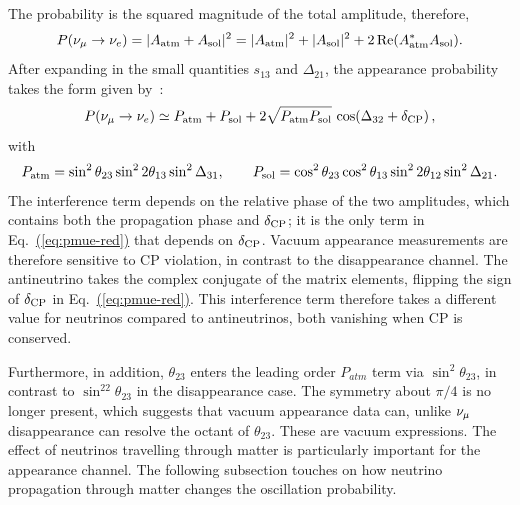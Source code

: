 The probability is the squared magnitude of the total amplitude, therefore,
\begin{equation}
    P(\nu_\mu\to\nu_e) = |A_{\rm atm} + A_{\rm sol}|^{2}
    = |A_{\rm atm}|^{2} + |A_{\rm sol}|^{2} + 2\,\mathrm{Re}(A_{\rm atm}^{*}A_{\rm sol}).
    \label{eq:pmue-amplitude}
\end{equation}
After expanding in the small quantities $s_{13}$ and $\Delta_{21}$, the appearance probability takes the form given by~\cite{NunokawaParkeValle2008,Cervera2000}:
\begin{equation}
    P(\nu_\mu \to \nu_e) \simeq P_{\rm atm} + P_{\rm sol}
    + 2\sqrt{P_{\rm atm}P_{\rm sol}}\,\cos\!\left(\Delta_{32} + \delta_{\rm CP}\right),
    \label{eq:pmue-red}
\end{equation}
with
\begin{equation}
    P_{\rm atm} = \sin^{2}\theta_{23}\sin^{2}2\theta_{13}\sin^{2}\Delta_{31},
    \qquad
    P_{\rm sol} = \cos^{2}\theta_{23}\cos^{2}\theta_{13}\sin^{2}2\theta_{12}\sin^{2}\Delta_{21}.
    \label{eq:patm-psol-red}
\end{equation}
The interference term depends on the relative phase of the two amplitudes, which contains both the propagation phase and $\delta_{\rm CP}$; it is the only term in Eq.~\hyperref[eq:pmue-red]{(\ref{eq:pmue-red})} that depends on $\delta_{\rm CP}$. Vacuum appearance measurements are therefore sensitive to CP violation, in contrast to the disappearance channel.
The antineutrino takes the complex conjugate of the matrix elements, flipping the sign of $\delta_{\rm CP}$ in Eq.~\hyperref[eq:pmue-red]{(\ref{eq:pmue-red})}. This interference term therefore takes a different value for neutrinos compared to antineutrinos, both vanishing when CP is conserved.

Furthermore, in addition, $\theta_{23}$ enters the leading order $P_{atm}$ term via $\sin^2\theta_{23}$, in contrast to $\sin^22\theta_{23}$ in the disappearance case. The symmetry about $\pi /4$ is no longer present, which suggests that vacuum appearance data can, unlike $\nu_\mu$ disappearance can resolve the octant of $\theta_{23}$. These are vacuum expressions. The effect of neutrinos travelling through matter is particularly important for the appearance channel. The following subsection touches on how neutrino propagation through matter changes the oscillation probability.










